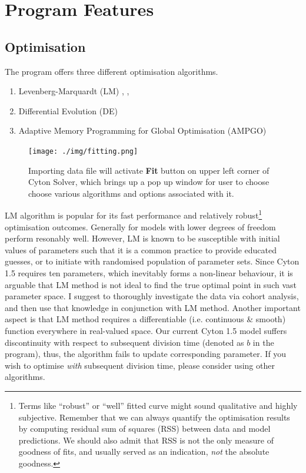 \documentclass{article}
\newcommand{\enterProblemHeader}[1]{
    }
\newcommand{\exitProblemHeader}[1]{
    }
\newcounter{homeworkProblemCounter} %
\newcommand{\homeworkProblemName}{}
\newenvironment{homeworkProblem}[1][Problem \arabic{homeworkProblemCounter}]{ %
    \stepcounter{homeworkProblemCounter} %
    \renewcommand{\homeworkProblemName}{#1} %
    \section{\homeworkProblemName} %
    \enterProblemHeader{\homeworkProblemName} %
    }{
    \exitProblemHeader{\homeworkProblemName} %
    }
\begin{document}
\begin{homeworkProblem}[Program Features]
        \subsection{Optimisation}
        The program offers three different optimisation algorithms.
        \begin{enumerate}
            \item Levenberg-Marquardt (LM) \cite{1944Levenberg}, \cite{1963Marquardt}, \cite{Croeze}
            \item Differential Evolution (DE) \cite{1997StornPrice}
            \item Adaptive Memory Programming for Global Optimisation (AMPGO) \cite{2010Lasdon}
        \end{enumerate}
        \begin{figure}[h]
            \texttt{[image: ./img/fitting.png]}
            \centering
            \caption{Importing data file will activate \textbf{Fit} button on upper left corner of Cyton Solver, which brings up a pop up window for user to choose choose various algorithms and options associated with it.}
            \label{fig:fitting_procedure}
        \end{figure}
        LM algorithm is popular for its fast performance and relatively robust\footnote{Terms like ``robust'' or ``well'' fitted curve might sound qualitative and highly subjective. Remember that we can always quantify the optimisation results by computing residual sum of squares (RSS) between data and model predictions. We should also admit that RSS is not the only measure of goodness of fits, and usually served as an indication, \textit{not} the absolute goodness.} optimisation outcomes. Generally for models with lower degrees of freedom perform resonably well. However, LM is known to be susceptible with initial values of parameters such that it is a common practice to provide educated guesses, or to initiate with randomised population of parameter sets. Since Cyton 1.5 requires ten parameters, which inevitably forms a non-linear behaviour, it is arguable that LM method is not ideal to find the true optimal point in such vast parameter space. I suggest to thoroughly investigate the data via cohort analysis, and then use that knowledge in conjunction with LM method. Another important aspect is that LM method requires a differentiable (i.e. continuous \& smooth) function everywhere in real-valued space. Our current Cyton 1.5 model suffers discontinuity with respect to subsequent division time (denoted as $b$ in the program), thus, the algorithm fails to update corresponding parameter. If you wish to optimise \textit{with} subsequent division time, please consider using other algorithms.


\end{homeworkProblem}
\end{document}
